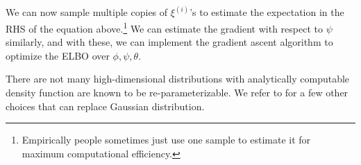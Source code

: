 We can now sample multiple copies of $\xi^{(i)}$'s to estimate the %
expectation in the RHS of the equation above.\footnote{Empirically people sometimes just use one sample to estimate it for maximum
computational efficiency.} We can estimate the gradient with
respect to $\psi$ similarly, and with these, we can implement the gradient ascent
algorithm to optimize the ELBO over $\phi,\psi,\theta$.

There are not many high-dimensional distributions with analytically
computable density function are known to be re-parameterizable. We refer to \citeauthor{kingma2013auto}
for a few other choices that can replace Gaussian distribution.
